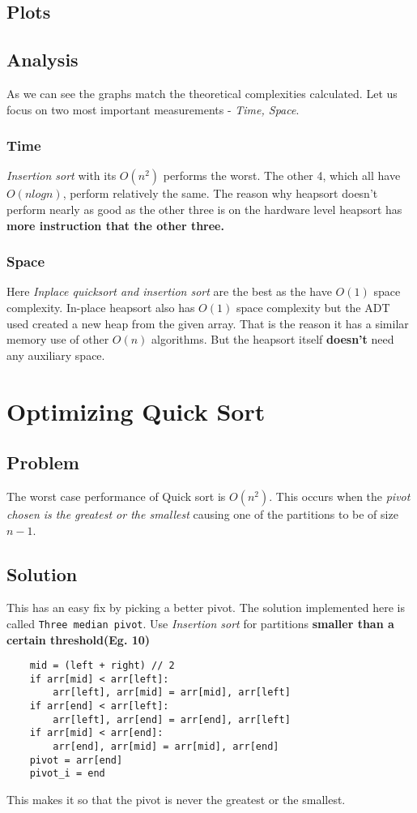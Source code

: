 \documentclass[12pt]{article}
\begin{document}
\subsection{Plots}





\subsection{Analysis}
As we can see the graphs match the theoretical complexities calculated. Let us
focus on two most important measurements - \textit{Time, Space}.
\subsubsection{Time}
\textit{Insertion sort} with its $O(n^2)$ performs the worst.
The other 4, which all have $O(nlogn)$, perform relatively the same.
The reason why heapsort doesn't perform nearly as good as the other three is
on the hardware level heapsort has \textbf{more instruction that the other three.}
\subsubsection{Space}
Here \textit{Inplace quicksort and insertion sort} are the best as the have
$O(1)$ space complexity. In-place heapsort also has $O(1)$ space complexity
but the ADT used created a new heap from the given array. That is the reason
it has a similar memory use of other $O(n)$ algorithms. But the heapsort
itself \textbf{doesn't} need any auxiliary space.
\section{Optimizing Quick Sort}
\subsection{Problem}
The worst case performance of Quick sort is $O(n^2)$. This occurs when the
\textit{pivot chosen is the greatest or the smallest} causing one of the
partitions to be of size $n-1$.
\subsection{Solution}
This has an easy fix by picking a better pivot. The solution implemented here
is called \texttt{Three median pivot}. Use \textit{Insertion sort} for
partitions \textbf{smaller than a certain threshold(Eg. 10)}
\begin{verbatim}
    mid = (left + right) // 2
    if arr[mid] < arr[left]:
        arr[left], arr[mid] = arr[mid], arr[left]
    if arr[end] < arr[left]:
        arr[left], arr[end] = arr[end], arr[left]
    if arr[mid] < arr[end]:
        arr[end], arr[mid] = arr[mid], arr[end]
    pivot = arr[end]
    pivot_i = end
\end{verbatim}
This makes it so that the pivot is never the greatest or the smallest.
\end{document}
